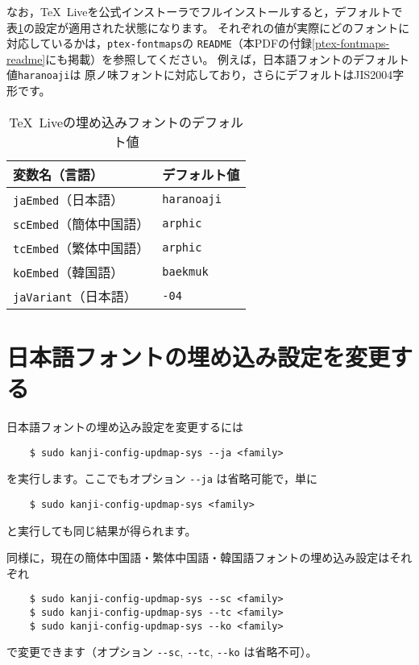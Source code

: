 \documentclass{jlreq}
\def\file#1{\texttt{#1}}
\def\command#1{\texttt{#1}}
\def\option#1{\texttt{-{}-#1}}
\def\TL{\TeX\ Live}
\begin{document}
なお，\TL を公式インストーラでフルインストールすると，デフォルトで
表\ref{tldefault}の設定が適用された状態になります。
それぞれの値が実際にどのフォントに対応しているかは，\file{ptex-fontmaps}の
\file{README}（本PDFの付録\ref{ptex-fontmaps-readme}にも掲載）を参照してください。
例えば，日本語フォントのデフォルト値\command{haranoaji}は
原ノ味フォントに対応しており，さらにデフォルトはJIS2004字形です。
\begin{table}[h]
  \centering
  \caption{\TL の埋め込みフォントのデフォルト値}\label{tldefault}
  \begin{tabular}{m{}m{}}
  \hline
  変数名（言語）                  & デフォルト値        \\ \hline
  \command{jaEmbed}（日本語）     & \command{haranoaji} \\
  \command{scEmbed}（簡体中国語） & \command{arphic}    \\
  \command{tcEmbed}（繁体中国語） & \command{arphic}    \\
  \command{koEmbed}（韓国語）     & \command{baekmuk}   \\
  \command{jaVariant}（日本語）   & \command{-04}       \\ \hline
\end{tabular}
\end{table}


\clearpage


\section{日本語フォントの埋め込み設定を変更する}

日本語フォントの埋め込み設定を変更するには
\begin{verbatim}
    $ sudo kanji-config-updmap-sys --ja <family>
\end{verbatim}
を実行します。ここでもオプション \option{ja} は省略可能で，単に
\begin{verbatim}
    $ sudo kanji-config-updmap-sys <family>
\end{verbatim}
と実行しても同じ結果が得られます。

同様に，現在の簡体中国語・繁体中国語・韓国語フォントの埋め込み設定はそれぞれ
\begin{verbatim}
    $ sudo kanji-config-updmap-sys --sc <family>
    $ sudo kanji-config-updmap-sys --tc <family>
    $ sudo kanji-config-updmap-sys --ko <family>
\end{verbatim}
で変更できます（オプション \option{sc}, \option{tc}, \option{ko} は省略不可）。
\end{document}
